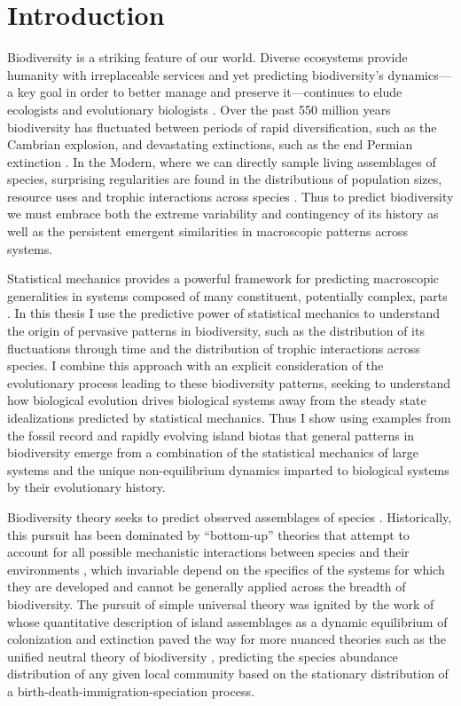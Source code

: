 \chapter*{Introduction}


Biodiversity is a striking feature of our world. Diverse ecosystems
provide humanity with irreplaceable services \citep{daily1997} and yet
predicting biodiversity's dynamics---a key goal in order to better
manage and preserve it---continues to elude ecologists and
evolutionary biologists \citep{mcgill2010, gould1985}. Over the past
550 million years biodiversity has fluctuated between periods of rapid
diversification, such as the Cambrian explosion, and devastating
extinctions, such as the end Permian extinction \citep{sepkoski1992,
  alroy08}. In the Modern, where we can directly sample living
assemblages of species, surprising regularities are found in the
distributions of population sizes, resource uses and trophic
interactions across species \citep{brown1995, hubbell2001, nekola2007,
  harte2011, Jordano2003, nuismer2013, berlow2009}. Thus to predict
biodiversity we must embrace both the extreme variability and
contingency of its history as well as the persistent emergent
similarities in macroscopic patterns across systems.

Statistical mechanics provides a powerful framework for predicting
macroscopic generalities in systems composed of many constituent,
potentially complex, parts \citep[e.g.][]{albert2002, sethna2006}.  In
this thesis I use the predictive power of statistical mechanics to
understand the origin of pervasive patterns in biodiversity, such as
the distribution of its fluctuations through time and the distribution
of trophic interactions across species.  I combine this approach with
an explicit consideration of the evolutionary process leading to these
biodiversity patterns, seeking to understand how biological evolution
drives biological systems away from the steady state idealizations
predicted by statistical mechanics.  Thus I show using examples from
the fossil record and rapidly evolving island biotas that general
patterns in biodiversity emerge from a combination of the statistical
mechanics of large systems and the unique non-equilibrium dynamics
imparted to biological systems by their evolutionary history.

Biodiversity theory seeks to predict observed assemblages of species
\citep{hubbell2001}. Historically, this pursuit has been dominated by
``bottom-up'' theories that attempt to account for all possible
mechanistic interactions between species and their environments
\citep{hubbell2001, haegeman2008, harte2011}, which invariable depend
on the specifics of the systems for which they are developed and
cannot be generally applied across the breadth of biodiversity.  The
pursuit of simple universal theory was ignited by the work of
\citet{macWilson} whose quantitative description of island assemblages
as a dynamic equilibrium of colonization and extinction paved the way
for more nuanced theories such as the unified neutral theory of
biodiversity \citep{hubbell2001}, predicting the species abundance
distribution of any given local community based on the stationary
distribution of a birth-death-immigration-speciation process.

